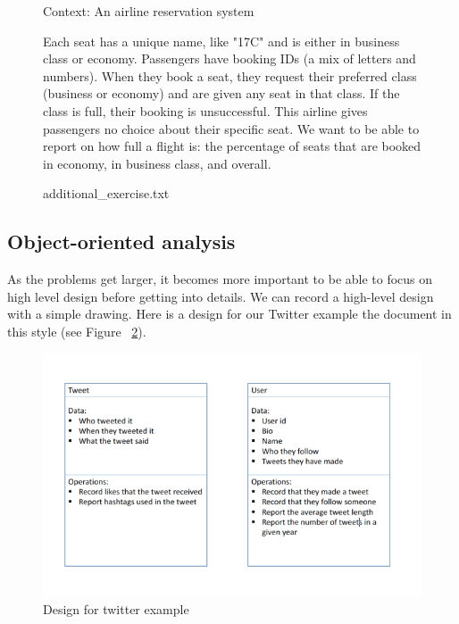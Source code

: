 \documentclass[12pt]{article}
\begin{document}
\begin{figure}
\begin{mdframed}
        \bigskip

        Context: An airline reservation system

        \bigskip

        Each seat has a unique name, like "17C" and is either in business class or
        economy. Passengers have booking IDs (a mix of letters and numbers). When they
        book a seat, they request their preferred class (business or economy) and are
        given any seat in that class. If the class is full, their booking is
        unsuccessful. This airline gives passengers no choice about their specific seat.
        We want to be able to report on how full a flight is: the percentage of seats
        that are booked in economy, in business class, and overall.

    \end{mdframed}
    \caption{additional\_exercise.txt}
    \label{fig:additionalExercise}
\end{figure}

\bigskip

\subsection*{Object-oriented analysis}
As the problems get larger, it becomes more important to be able to focus on high
level design before getting into details. We can record a high-level design with
a simple drawing. Here is a design for our Twitter example the document
in this style (see Figure ~\ref{fig:uml}).

\bigskip

\begin{figure}
    \begin{center}
    \includegraphics[width=0.8\linewidth]{../images/lab_2/uml.png}
    \end{center}
    \caption{Design for twitter example}
    \label{fig:uml}
\end{figure}
\end{document}
